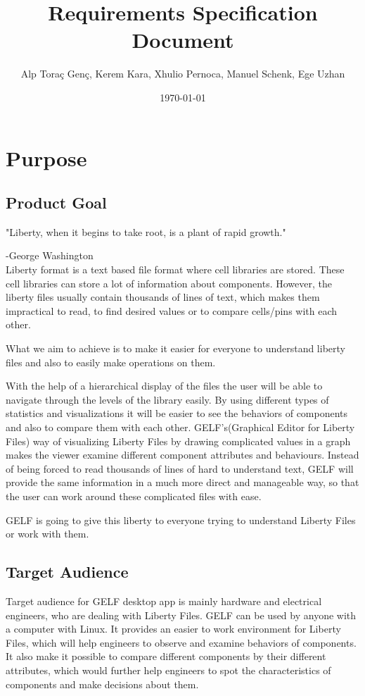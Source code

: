 \documentclass[10pt,a4paper]{report}
\title{Requirements Specification Document}
\author{Alp Toraç Genç, Kerem Kara, Xhulio Pernoca, Manuel Schenk, Ege Uzhan}
\date{\today}
\begin{document}
\maketitle
\label{sec:title}
\tableofcontents

\chapter{Purpose}
\section{Product Goal}
\bigskip
"Liberty, when it begins to take root, is a plant of rapid growth." 

-George Washington \\


Liberty format is a text based file format where cell libraries are stored. These cell libraries can store a lot of information about components. However, the liberty files usually contain thousands of lines of text, which makes them impractical to read, to find desired values or to compare cells/pins with each other. \bigskip

What we aim to achieve is to make it easier for everyone to understand liberty files and also to easily make operations on them.  \bigskip

With the help of a hierarchical display of the files the user will be able to navigate through the levels of the library easily. By using different types of statistics and visualizations it will be easier to see the behaviors of components and also to compare them with each other. GELF's(Graphical Editor for Liberty Files) way of visualizing Liberty Files by drawing complicated values in a graph makes the viewer examine different component attributes and behaviours. Instead of being forced to read thousands of lines of hard to understand text, GELF will provide the same information in a much more direct and manageable way, so that the user can work around these complicated files with ease.\bigskip

GELF is going to give this liberty to everyone trying to understand Liberty Files or work with them.
\section{Target Audience}
Target audience for GELF desktop app is mainly hardware and electrical engineers, who are dealing with Liberty Files. GELF can be used by anyone with a computer with Linux. It provides an easier to work environment for Liberty Files, which will help engineers to observe and examine behaviors of components. It also make it possible to compare different components by their different attributes, which would further help engineers to spot the characteristics of components and make decisions about them.
\end{document}
